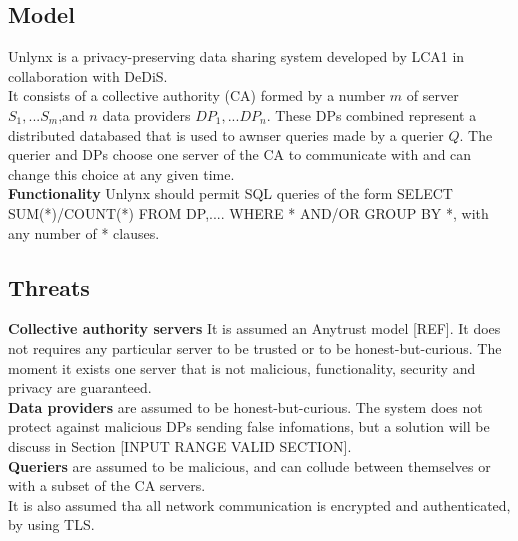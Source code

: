 \documentclass{article}
\begin{document}
\subsection{Model}
Unlynx is a privacy-preserving data sharing system developed by LCA1 in collaboration with DeDiS.\\
It consists of a collective authority (CA) formed by a number $m$ of server $S_1,...S_m$,and $n$ data providers $DP_1,...DP_n$. These DPs combined represent a distributed databased that is used to awnser queries made by a querier $Q$. The querier and DPs choose one server of the CA to communicate with and can change this choice at any given time.\\
\textbf{Functionality} Unlynx should permit SQL queries of the form SELECT SUM(*)/COUNT(*) FROM DP,.... WHERE * AND/OR GROUP BY *, with any number of * clauses.

\subsection{Threats}
\textbf{Collective authority servers} It is assumed an Anytrust model [REF]. It does not requires any particular server to be trusted or to be honest-but-curious. The moment it exists one server that is not malicious, functionality, security and privacy are guaranteed.\\
\textbf{Data providers} are assumed to be honest-but-curious. The system does not protect against malicious DPs sending false infomations, but a solution will be discuss  in Section [INPUT RANGE VALID SECTION].\\
\textbf{Queriers} are assumed to be malicious, and can collude between themselves or with a subset of the CA servers.\\
It is also assumed tha all network communication is encrypted and authenticated, by using TLS.
\end{document}
